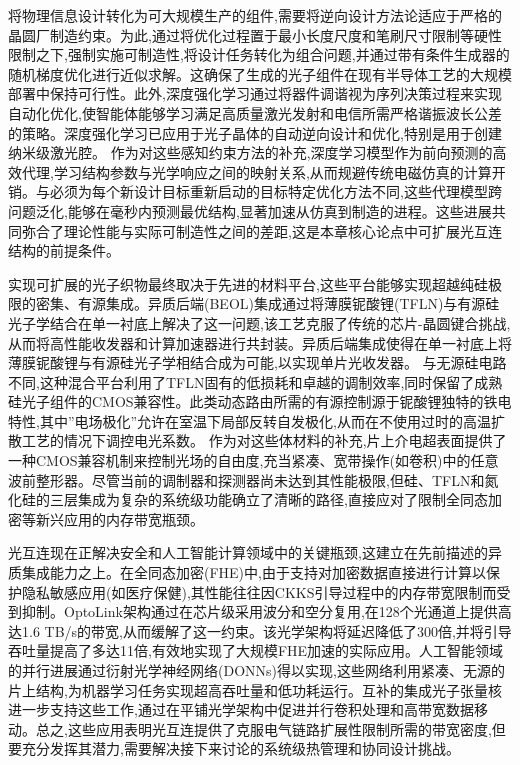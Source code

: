 将物理信息设计转化为可大规模生产的组件,需要将逆向设计方法论适应于严格的晶圆厂制造约束。为此,通过将优化过程置于最小长度尺度和笔刷尺寸限制等硬性限制之下,强制实施可制造性,将设计任务转化为组合问题,并通过带有条件生成器的随机梯度优化进行近似求解。这确保了生成的光子组件在现有半导体工艺的大规模部署中保持可行性。此外,深度强化学习通过将器件调谐视为序列决策过程来实现自动化优化,使智能体能够学习满足高质量激光发射和电信所需严格谐振波长公差的策略。深度强化学习已应用于光子晶体的自动逆向设计和优化,特别是用于创建纳米级激光腔。\citep{doi_10_1515_nanoph_2022_0692_4b166807} 作为对这些感知约束方法的补充,深度学习模型作为前向预测的高效代理,学习结构参数与光学响应之间的映射关系,从而规避传统电磁仿真的计算开销。与必须为每个新设计目标重新启动的目标特定优化方法不同,这些代理模型跨问题泛化,能够在毫秒内预测最优结构,显著加速从仿真到制造的进程。这些进展共同弥合了理论性能与实际可制造性之间的差距,这是本章核心论点中可扩展光互连结构的前提条件。\citep{doi_10_1021_acsphotonics_2c00313_0d7d39c3} \citep{doi_10_1515_nanoph_2022_0692_4b166807} \citep{doi_10_29026_oes_2022_210012_27973a69} \citep{doi_10_1109_jphot_2022_3182050_3cfb78ba}

实现可扩展的光子织物最终取决于先进的材料平台,这些平台能够实现超越纯硅极限的密集、有源集成。异质后端(BEOL)集成通过将薄膜铌酸锂(TFLN)与有源硅光子学结合在单一衬底上解决了这一问题,该工艺克服了传统的芯片-晶圆键合挑战,从而将高性能收发器和计算加速器进行共封装。异质后端集成使得在单一衬底上将薄膜铌酸锂与有源硅光子学相结合成为可能,以实现单片光收发器。\citep{s2_9b444e84d20ae6e3d62d2d4df30268b5a53baad2_40af2cc9} 与无源硅电路不同,这种混合平台利用了TFLN固有的低损耗和卓越的调制效率,同时保留了成熟硅光子组件的CMOS兼容性。此类动态路由所需的有源控制源于铌酸锂独特的铁电特性,其中''电场极化''允许在室温下局部反转自发极化,从而在不使用过时的高温扩散工艺的情况下调控电光系数。\citep{s2_a1b7de5981aa9a6aa9f9bd0c4422d9b023fc454f_bec494c5} \citep{doi_10_1117_12_2654937_d0b4bc2b} 作为对这些体材料的补充,片上介电超表面提供了一种CMOS兼容机制来控制光场的自由度,充当紧凑、宽带操作(如卷积)中的任意波前整形器。尽管当前的调制器和探测器尚未达到其性能极限,但硅、TFLN和氮化硅的三层集成为复杂的系统级功能确立了清晰的路径,直接应对了限制全同态加密等新兴应用的内存带宽瓶颈。\citep{s2_9b444e84d20ae6e3d62d2d4df30268b5a53baad2_40af2cc9} \citep{doi_10_1126_science_abj4396_40f36a09} \citep{doi_10_1515_nanoph_2022_0294_1bd118d5} \citep{doi_10_1145_3806395_315ab915}

光互连现在正解决安全和人工智能计算领域中的关键瓶颈,这建立在先前描述的异质集成能力之上。在全同态加密(FHE)中,由于支持对加密数据直接进行计算以保护隐私敏感应用(如医疗保健),其性能往往因CKKS引导过程中的内存带宽限制而受到抑制。OptoLink架构通过在芯片级采用波分和空分复用,在128个光通道上提供高达1.6 TB/s的带宽,从而缓解了这一约束。该光学架构将延迟降低了300倍,并将引导吞吐量提高了多达11倍,有效地实现了大规模FHE加速的实际应用。人工智能领域的并行进展通过衍射光学神经网络(DONNs)得以实现,这些网络利用紧凑、无源的片上结构,为机器学习任务实现超高吞吐量和低功耗运行。互补的集成光子张量核进一步支持这些工作,通过在平铺光学架构中促进并行卷积处理和高带宽数据移动。总之,这些应用表明光互连提供了克服电气链路扩展性限制所需的带宽密度,但要充分发挥其潜力,需要解决接下来讨论的系统级热管理和协同设计挑战。\citep{doi_10_1145_3806395_315ab915} \citep{doi_10_1002_nap2_70098_8d5f2f8a} \citep{doi_10_1515_nanoph_2022_0423_38a2c3ec}

